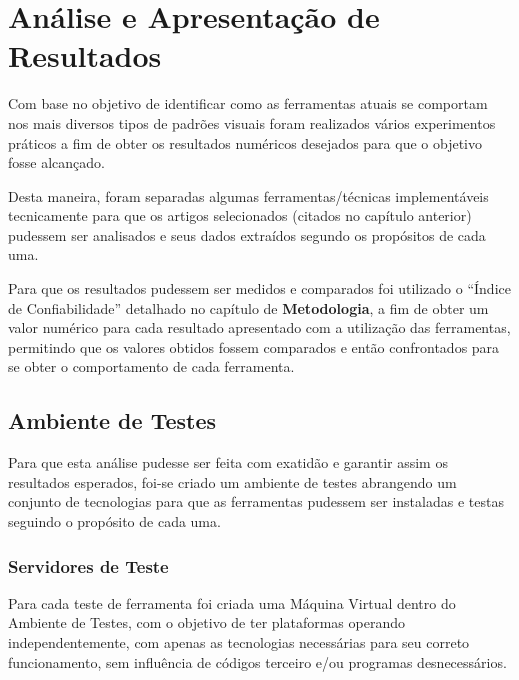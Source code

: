 
\chapter{Análise e Apresentação de Resultados}


Com base no objetivo de identificar como as ferramentas atuais se comportam nos mais diversos tipos de padrões visuais foram realizados vários experimentos práticos a fim de obter os resultados numéricos desejados para que o objetivo fosse alcançado.

Desta maneira, foram separadas algumas ferramentas/técnicas implementáveis tecnicamente para que os artigos selecionados (citados no capítulo anterior) pudessem ser analisados e seus dados extraídos segundo os propósitos de cada uma.


Para que os resultados pudessem ser medidos e comparados foi utilizado o ``Índice de Confiabilidade'' detalhado no capítulo de \textbf{Metodologia}, a fim de obter um valor numérico para cada resultado apresentado com a utilização das ferramentas, permitindo que os valores obtidos fossem comparados e então confrontados para se obter o comportamento de cada ferramenta.



\section{Ambiente de Testes}

Para que esta análise pudesse ser feita com exatidão e garantir assim os resultados esperados, foi-se criado um ambiente de testes abrangendo um conjunto de tecnologias para que as ferramentas pudessem ser instaladas e testas seguindo o propósito de cada uma.

\subsection{Servidores de Teste}

Para cada teste de ferramenta foi criada uma Máquina Virtual dentro do Ambiente de Testes, com o objetivo de ter plataformas operando independentemente, com apenas as tecnologias necessárias para seu correto funcionamento, sem influência de códigos terceiro e/ou programas desnecessários.

